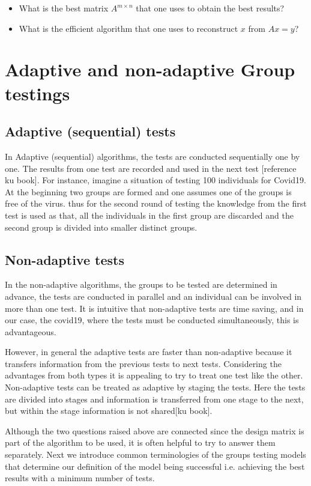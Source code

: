 \documentclass[12pt,a4paper]{article}
\begin{document}
	  \begin{itemize}
	  	\item What is the best matrix $ A^{m\times n} $   \quad that one uses to obtain the best results? 
	  	\item What is the efficient algorithm that one uses to reconstruct $ x $ from $ Ax = y $?   
	  \end{itemize}   
	 \section{Adaptive and non-adaptive Group testings}
	 \subsection{Adaptive (sequential) tests}
	 In Adaptive (sequential) algorithms, the tests are conducted sequentially one by one. The results from one test are recorded and used in the next test [reference ku book]. For instance, imagine a situation of testing 100 individuals for Covid19. At the beginning two groups are formed and one assumes one of the groups is free of the virus. thus for the second round of testing the knowledge from the first test is used as that, all the individuals in the first group are discarded and the second group is divided into smaller distinct groups. 
	 \subsection{Non-adaptive tests}
	 In the non-adaptive algorithms, the groups to be tested are determined in advance, the tests are conducted in parallel and an individual can be involved in more than one test. It is intuitive that non-adaptive tests are time saving, and in our case, the covid19, where the tests must be conducted simultaneously, this is advantageous. 
	 
	 However, in general the adaptive tests are faster than non-adaptive because it transfers information from the previous tests to next tests. Considering the advantages from both types it is appealing to try to treat one test like the other. Non-adaptive tests can be treated as adaptive by staging the tests. Here the tests are divided into stages and information is transferred from one stage to the next, but within the stage information is not shared[ku book].
	 
	 
	 
	 Although the two questions raised above are connected since the design matrix is part of the algorithm to be used, it is often helpful to try to answer them separately.   
	 Next we introduce common terminologies of the groups testing models that determine our definition of the model being successful i.e. achieving the best results with a minimum number of tests.
	 
\end{document}
